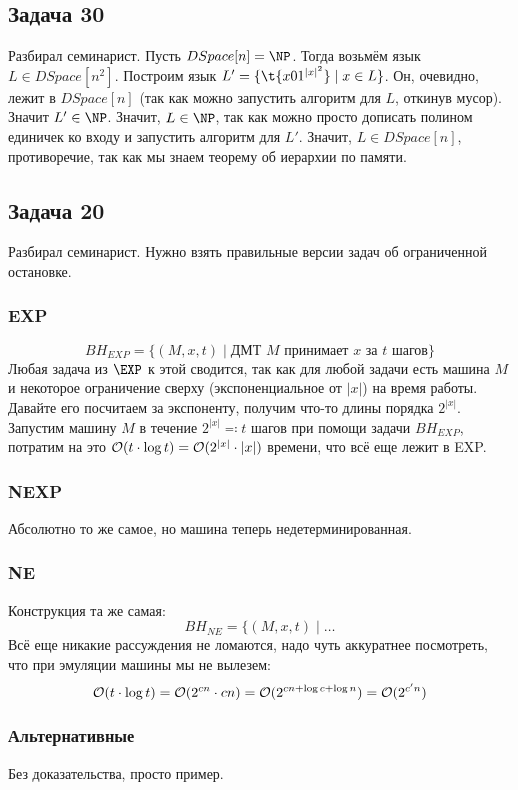 \subsection{Задача 30}
	Разбирал семинарист.
	Пусть $DSpace[n] = \NP$.
	Тогда возьмём язык $L \in DSpace[n^2]$.
	Построим язык $L' = \{ \t{x01^{|x|^2}} \mid x \in L \}$.
	Он, очевидно, лежит в $DSpace[n]$ (так как можно запустить алгоритм для $L$, откинув мусор).
	Значит $L' \in \NP$.
	Значит, $L \in \NP$, так как можно просто дописать полином единичек ко входу и запустить алгоритм для $L'$.
	Значит, $L \in DSpace[n]$, противоречие, так как мы знаем теорему об иерархии по памяти.

\subsection{Задача 20}
	Разбирал семинарист.
	Нужно взять правильные версии задач об ограниченной остановке.

	\subsubsection{EXP}
		\[ BH_{EXP} = \{ (M, x, t) \mid \text{ДМТ $M$ принимает $x$ за $t$ шагов} \} \]
		Любая задача из $\EXP$ к этой сводится, так как для любой задачи есть машина $M$
		и некоторое ограничение сверху (экспоненциальное от $|x|$) на время работы.
		Давайте его посчитаем за экспоненту, получим что-то длины порядка $2^{|x|}$.
		Запустим машину $M$ в течение $2^{|x|} \eqcolon t$ шагов при помощи задачи $BH_{EXP}$,
		потратим на это $\mathcal O(t \cdot \log t)=\mathcal O(2^{|x|} \cdot |x|)$ времени, что всё еще лежит в EXP.

	\subsubsection{NEXP}
		Абсолютно то же самое, но машина теперь недетерминированная.

	\subsubsection{NE}
		Конструкция та же самая:
		\[ BH_{NE} = \{ (M, x, t) \mid \dots \]
		Всё еще никакие рассуждения не ломаются, надо чуть аккуратнее посмотреть, что при эмуляции
		машины мы не вылезем:
		\[ \mathcal O(t \cdot \log t) = \mathcal O(2^{cn} \cdot cn) = \mathcal O(2^{cn+\log c + \log n}) = \mathcal O(2^{c'n})\]

	\subsubsection{Альтернативные}
		Без доказательства, просто пример.

